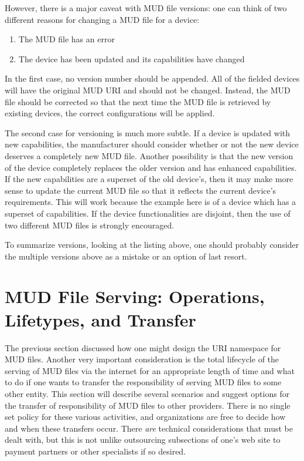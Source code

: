 \documentclass[conference]{IEEEtran}
\begin{document}
{However, there is a major caveat with MUD file versions: one can think
of two different reasons for changing a MUD file for a device:
\begin{enumerate}
\item The MUD file has an error
\item The device has been updated and its capabilities have changed
\end{enumerate}

In the first case, no version number should be appended.  All of the
fielded devices will have the original MUD URI and should not be
changed.  Instead, the MUD file should be corrected so that the next
time the MUD file is retrieved by existing devices, the correct
configurations will be applied.

The second case for versioning is much more subtle.  If a device is
updated with new capabilities, the manufacturer should consider whether
or not the new device deserves a completely new MUD file.  Another
possibility is that the new version of the device completely replaces
the older version and has enhanced capabilities.  If the new
capabilities are a superset of the old device's, then it may make more
sense to update the current MUD file so that it reflects the current
device's requirements.  This will work because the example here is of
a device which has a superset of capabilities.  If the device
functionalities are disjoint, then the use of two different MUD files
is strongly encouraged.

To summarize versions, looking at the listing above, one should
probably consider the multiple versions above as a mistake or an
option of last resort.
}

\section{MUD File Serving: Operations, Lifetypes, and Transfer}

The previous section discussed how one might design the URI namespace
for MUD files.  Another very important consideration is the total
lifecycle of the serving of MUD files via the internet for an
appropriate length of time and what to do if one wants to transfer the
responsibility of serving MUD files to some other entity.  This
section will describe several scenarios and suggest options for the
transfer of responsibility of MUD files to other providers.  There is
no single set policy for these various activities, and organizations
are free to decide how and when these transfers occur.  There {\em
  are} technical considerations that must be dealt with, but this is
not unlike outsourcing subsections of one's web site to payment
partners or other specialists if so desired.
\end{document}
